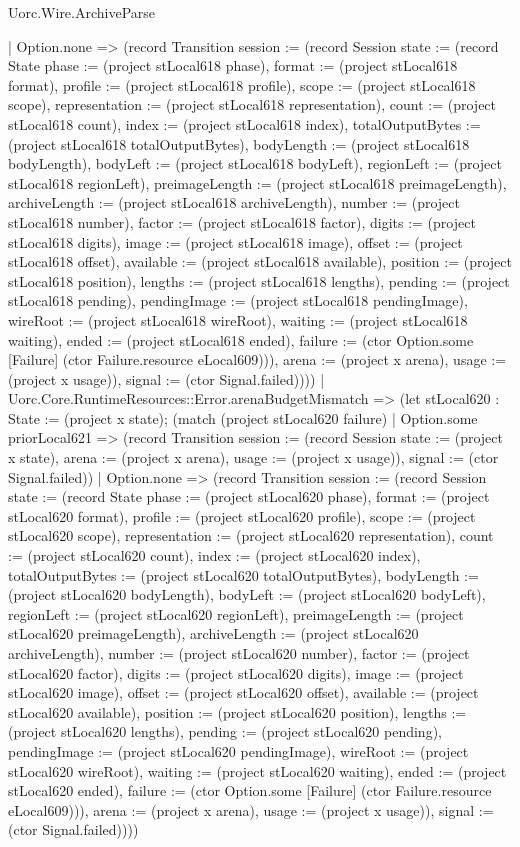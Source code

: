 \begin{lexlean}{Uorc.Wire.ArchiveParse}
\begin{semanticmodule}
{        | Option.none => (record Transition {session := (record Session {state := (record State {phase := (project stLocal618 phase), format := (project stLocal618 format), profile := (project stLocal618 profile), scope := (project stLocal618 scope), representation := (project stLocal618 representation), count := (project stLocal618 count), index := (project stLocal618 index), totalOutputBytes := (project stLocal618 totalOutputBytes), bodyLength := (project stLocal618 bodyLength), bodyLeft := (project stLocal618 bodyLeft), regionLeft := (project stLocal618 regionLeft), preimageLength := (project stLocal618 preimageLength), archiveLength := (project stLocal618 archiveLength), number := (project stLocal618 number), factor := (project stLocal618 factor), digits := (project stLocal618 digits), image := (project stLocal618 image), offset := (project stLocal618 offset), available := (project stLocal618 available), position := (project stLocal618 position), lengths := (project stLocal618 lengths), pending := (project stLocal618 pending), pendingImage := (project stLocal618 pendingImage), wireRoot := (project stLocal618 wireRoot), waiting := (project stLocal618 waiting), ended := (project stLocal618 ended), failure := (ctor Option.some [Failure] (ctor Failure.resource eLocal609))}), arena := (project x arena), usage := (project x usage)}), signal := (ctor Signal.failed)})))
      | Uorc.Core.RuntimeResources::Error.arenaBudgetMismatch => (let stLocal620 : State := (project x state); (match (project stLocal620 failure)
        | Option.some priorLocal621 => (record Transition {session := (record Session {state := (project x state), arena := (project x arena), usage := (project x usage)}), signal := (ctor Signal.failed)})
        | Option.none => (record Transition {session := (record Session {state := (record State {phase := (project stLocal620 phase), format := (project stLocal620 format), profile := (project stLocal620 profile), scope := (project stLocal620 scope), representation := (project stLocal620 representation), count := (project stLocal620 count), index := (project stLocal620 index), totalOutputBytes := (project stLocal620 totalOutputBytes), bodyLength := (project stLocal620 bodyLength), bodyLeft := (project stLocal620 bodyLeft), regionLeft := (project stLocal620 regionLeft), preimageLength := (project stLocal620 preimageLength), archiveLength := (project stLocal620 archiveLength), number := (project stLocal620 number), factor := (project stLocal620 factor), digits := (project stLocal620 digits), image := (project stLocal620 image), offset := (project stLocal620 offset), available := (project stLocal620 available), position := (project stLocal620 position), lengths := (project stLocal620 lengths), pending := (project stLocal620 pending), pendingImage := (project stLocal620 pendingImage), wireRoot := (project stLocal620 wireRoot), waiting := (project stLocal620 waiting), ended := (project stLocal620 ended), failure := (ctor Option.some [Failure] (ctor Failure.resource eLocal609))}), arena := (project x arena), usage := (project x usage)}), signal := (ctor Signal.failed)})))
}
\end{semanticmodule}
\end{lexlean}
